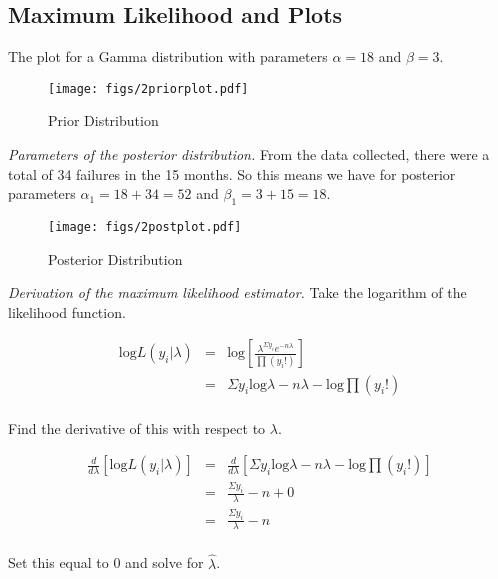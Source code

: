 \documentclass[12pt]{article}
\begin{document}
\subsection{Maximum Likelihood and Plots}

\noindent The plot for a Gamma distribution with parameters $\alpha=18$ and $\beta=3$.

\begin{figure}[H]
\begin{center}
\texttt{[image: figs/2priorplot.pdf]}
\caption{Prior Distribution}
\end{center}
\end{figure}

\noindent \textit{Parameters of the posterior distribution.}  From the data collected, there were a total of 34 failures in the 15 months.  So this means we have for posterior parameters $\alpha_1=18+34=52$ and $\beta_1=3+15=18$.

\begin{figure}[H]
\begin{center}
\texttt{[image: figs/2postplot.pdf]}
\caption{Posterior Distribution}
\end{center}
\end{figure}

\noindent \textit{Derivation of the maximum likelihood estimator.}  Take the logarithm of the likelihood function.

\begin{eqnarray*}
\mathrm{log}L(y_i|\lambda) &=& \mathrm{log}\left[\frac{\lambda^{\Sigma y_i}e^{-n\lambda}}{\prod (y_i!)}\right] \\
&=& \Sigma y_i\mathrm{log}\lambda-n\lambda-\mathrm{log}\prod (y_i!) \\
\end{eqnarray*}

\noindent Find the derivative of this with respect to $\lambda$.

\begin{eqnarray*}
\frac{d}{d\lambda}\left[\mathrm{log}L(y_i|\lambda)\right] &=& \frac{d}{d\lambda}\left[\Sigma y_i\mathrm{log}\lambda-n\lambda-\mathrm{log}\prod (y_i!)\right] \\
&=& \frac{\Sigma y_i}{\lambda}-n+0 \\
&=& \frac{\Sigma y_i}{\lambda}-n \\
\end{eqnarray*}

\noindent Set this equal to 0 and solve for $\hat{\lambda}$.
\end{document}
